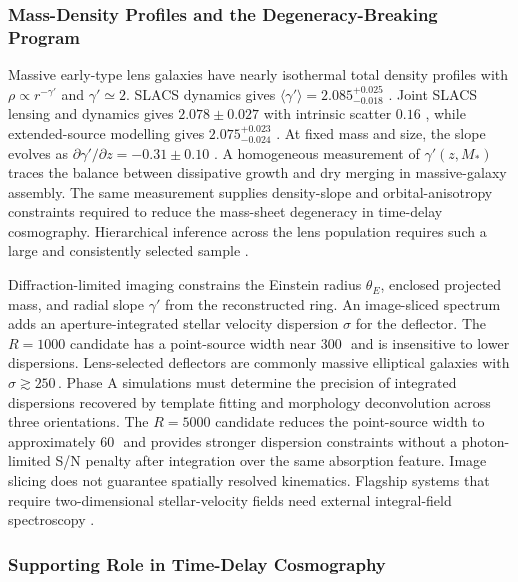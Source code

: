 \subsubsection{Mass-Density Profiles and the Degeneracy-Breaking Program}

Massive early-type lens galaxies have nearly isothermal total density profiles with $\rho\propto r^{-\gamma'}$ and $\gamma'\simeq2$. SLACS dynamics gives $\langle\gamma'\rangle=2.085^{+0.025}_{-0.018}$ \cite{koopmans2009}. Joint SLACS lensing and dynamics gives $2.078\pm0.027$ with intrinsic scatter $0.16$ \cite{auger2010}, while extended-source modelling gives $2.075^{+0.023}_{-0.024}$ \cite{etherington2023}. At fixed mass and size, the slope evolves as $\partial\gamma'/\partial z=-0.31\pm0.10$ \cite{sonnenfeld2013}. A homogeneous measurement of $\gamma'(z,M_\ast)$ traces the balance between dissipative growth and dry merging in massive-galaxy assembly. The same measurement supplies density-slope and orbital-anisotropy constraints required to reduce the mass-sheet degeneracy in time-delay cosmography. Hierarchical inference across the lens population requires such a large and consistently selected sample \cite{birrer2020}.

Diffraction-limited imaging constrains the Einstein radius $\theta_E$, enclosed projected mass, and radial slope $\gamma'$ from the reconstructed ring. An image-sliced spectrum adds an aperture-integrated stellar velocity dispersion $\sigma$ for the deflector. The $R=1000$ candidate has a point-source width near $300$\,\kms\ and is insensitive to lower dispersions. Lens-selected deflectors are commonly massive elliptical galaxies with $\sigma\gtrsim250$\,\kms. Phase A simulations must determine the precision of integrated dispersions recovered by template fitting and morphology deconvolution across three orientations. The $R=5000$ candidate reduces the point-source width to approximately $60$\,\kms\ and provides stronger dispersion constraints without a photon-limited S/N penalty after integration over the same absorption feature. Image slicing does not guarantee spatially resolved kinematics. Flagship systems that require two-dimensional stellar-velocity fields need external integral-field spectroscopy \cite{tdcosmo2025}.

\subsubsection{Supporting Role in Time-Delay Cosmography}

